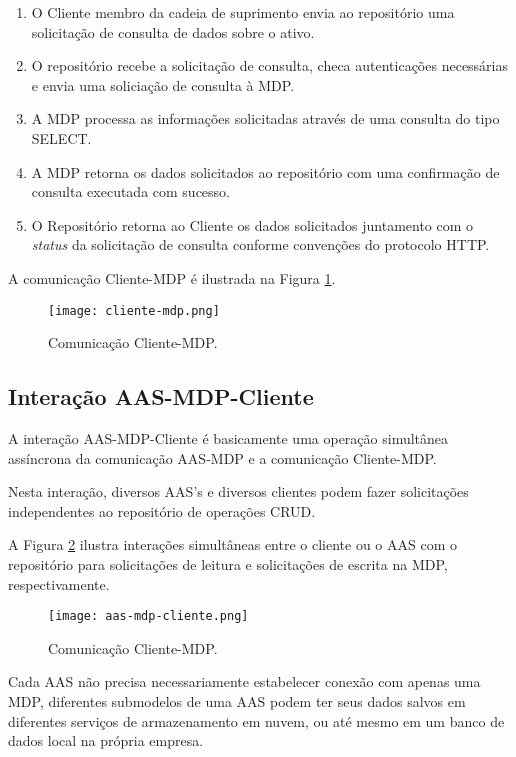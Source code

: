 	\begin{enumerate}
		\item O Cliente membro da cadeia de suprimento envia ao repositório uma solicitação de consulta de dados sobre o ativo.
		\item O repositório recebe a solicitação de consulta, checa autenticações necessárias e envia uma soliciação de consulta à MDP.
		\item A MDP processa as informações solicitadas através de uma consulta do tipo SELECT.
		\item A MDP retorna os dados solicitados ao repositório com uma confirmação de consulta executada com sucesso.
		\item O Repositório retorna ao Cliente os dados solicitados juntamento com o \textit{status} da solicitação de consulta conforme convenções do protocolo HTTP.
	\end{enumerate}
	
	
	A comunicação Cliente-MDP é ilustrada na Figura \ref{fig:cliente-mdp}.
	
	\begin{figure}[H]
		\centering
		\caption{Comunicação Cliente-MDP.}
		\texttt{[image: cliente-mdp.png]}
		\label{fig:cliente-mdp}
	\end{figure}
	
	
	\subsection{Interação AAS-MDP-Cliente}
	
	A interação AAS-MDP-Cliente é basicamente uma operação simultânea assíncrona da comunicação AAS-MDP e a comunicação Cliente-MDP.
	
	Nesta interação, diversos AAS's e diversos clientes podem fazer solicitações independentes ao repositório de operações CRUD.
	
	A Figura \ref{fig:aas-mdp-cliente} ilustra interações simultâneas entre o cliente ou o AAS com o repositório para solicitações de leitura e solicitações de escrita na MDP, respectivamente.
	
	\begin{figure}[H]
		\centering
		\caption{Comunicação Cliente-MDP.}
		\texttt{[image: aas-mdp-cliente.png]}
		\label{fig:aas-mdp-cliente}
	\end{figure}

	Cada AAS não precisa necessariamente estabelecer conexão com apenas uma MDP, diferentes submodelos de uma AAS podem ter seus dados salvos em diferentes serviços de armazenamento em nuvem, ou até mesmo em um banco de dados local na própria empresa.
	
